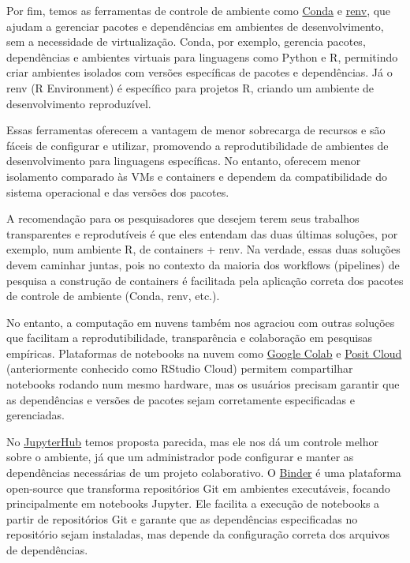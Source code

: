 \documentclass[
  a4paper,
]{book}
\begin{document}
Por fim, temos as ferramentas de controle de ambiente como
\href{https://docs.conda.io/projects/conda/en/stable/}{Conda} e
\href{https://rstudio.github.io/renv/articles/renv.html}{renv}, que
ajudam a gerenciar pacotes e dependências em ambientes de
desenvolvimento, sem a necessidade de virtualização. Conda, por exemplo,
gerencia pacotes, dependências e ambientes virtuais para linguagens como
Python e R, permitindo criar ambientes isolados com versões específicas
de pacotes e dependências. Já o renv (R Environment) é específico para
projetos R, criando um ambiente de desenvolvimento reproduzível.

Essas ferramentas oferecem a vantagem de menor sobrecarga de recursos e
são fáceis de configurar e utilizar, promovendo a reprodutibilidade de
ambientes de desenvolvimento para linguagens específicas. No entanto,
oferecem menor isolamento comparado às VMs e containers e dependem da
compatibilidade do sistema operacional e das versões dos pacotes.

A recomendação para os pesquisadores que desejem terem seus trabalhos
transparentes e reprodutíveis é que eles entendam das duas últimas
soluções, por exemplo, num ambiente R, de containers + renv. Na verdade,
essas duas soluções devem caminhar juntas, pois no contexto da maioria
dos workflows (pipelines) de pesquisa a construção de containers é
facilitada pela aplicação correta dos pacotes de controle de ambiente
(Conda, renv, etc.).

No entanto, a computação em nuvens também nos agraciou com outras
soluções que facilitam a reprodutibilidade, transparência e colaboração
em pesquisas empíricas. Plataformas de notebooks na nuvem como
\href{https://colab.research.google.com/}{Google Colab} e
\href{https://posit.cloud/}{Posit Cloud} (anteriormente conhecido como
RStudio Cloud) permitem compartilhar notebooks rodando num mesmo
hardware, mas os usuários precisam garantir que as dependências e
versões de pacotes sejam corretamente especificadas e gerenciadas.

No \href{https://jupyter.org/hub}{JupyterHub} temos proposta parecida,
mas ele nos dá um controle melhor sobre o ambiente, já que um
administrador pode configurar e manter as dependências necessárias de um
projeto colaborativo. O \href{https://mybinder.org/}{Binder} é uma
plataforma open-source que transforma repositórios Git em ambientes
executáveis, focando principalmente em notebooks Jupyter. Ele facilita a
execução de notebooks a partir de repositórios Git e garante que as
dependências especificadas no repositório sejam instaladas, mas depende
da configuração correta dos arquivos de dependências.
\end{document}
